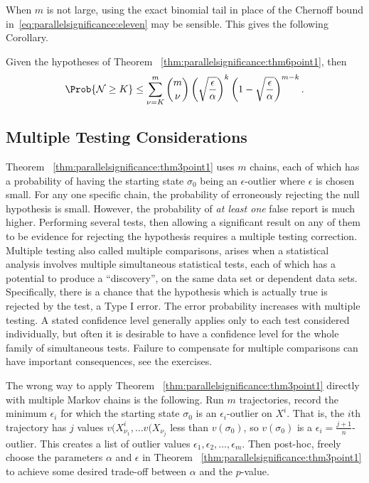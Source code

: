 \documentclass[12pt]{article}
\begin{document}
\begin{remark}
    When \( m \) is not large, using the exact binomial tail in place of
    the Chernoff bound in~\eqref{eq:parallelsignificance:eleven} may be
    sensible.  This gives the following Corollary.
\end{remark}

\begin{corollary}
    Given the hypotheses of Theorem~%
    \ref{thm:parallelsignificance:thm6point1}, then
    \[
        \Prob{\mathcal{N} \ge K} \le \sum\limits_ {\nu=K}^m \binom{m}{\nu}
        \left( \sqrt{\frac{\epsilon} {\alpha}} \right)^k \left( 1 -
        \sqrt{\frac {\epsilon}{\alpha}} \right)^ {m-k}.
    \]
\end{corollary}

\subsection*{Multiple Testing Considerations}

Theorem~%
\ref{thm:parallelsignificance:thm3point1} uses \( m \) chains, each of
which has a probability of having the starting state \( \sigma_0 \)
being an \( \epsilon \)-outlier where \( \epsilon \) is chosen small.
For any one specific chain, the probability of erroneously rejecting the
null hypothesis is small.  However, the probability of \emph{at least
one} false report is much higher. Performing several tests, then
allowing a significant result on any of them to be evidence for
rejecting the hypothesis requires a multiple testing correction.
Multiple testing%
also called multiple comparisons, arises when a statistical analysis
involves multiple simultaneous statistical tests, each of which has a
potential to produce a ``discovery'', on the same data set or dependent
data sets. Specifically, there is a chance that the hypothesis which is
actually true is rejected by the test, a Type I error.  The error
probability increases with multiple testing.  A stated confidence level
generally applies only to each test considered individually, but often
it is desirable to have a confidence level for the whole family of
simultaneous tests.  Failure to compensate for multiple comparisons can
have important consequences, see the exercises.

The wrong way to apply Theorem~%
\ref{thm:parallelsignificance:thm3point1} directly with multiple Markov
chains is the following.  Run \( m \) trajectories, record the minimum \(
\epsilon_i \) for which the starting state \( \sigma_0 \) is an \(
\epsilon_i \)-outlier on \( X^i \).  That is, the \( i \)th trajectory
has \( j \) values \( v(X_{\nu_1}^i, \dots v(X_{\nu_j} \) less than \( v
(\sigma_0) \), so \( v(\sigma_0) \) is a \( \epsilon_i = \frac{j+1}{n} \)-outlier.
This creates a list of outlier values \( \epsilon_1 , \epsilon_2, \dots,
\epsilon_ m \).  Then post-hoc, freely choose the parameters \( \alpha \)
and \( \epsilon \) in Theorem~%
\ref{thm:parallelsignificance:thm3point1} to achieve some desired
trade-off between \( \alpha \) and the \( p \)-value.
\end{document}
